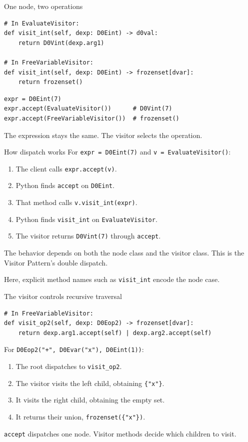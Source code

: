 \documentclass[aspectratio=169,11pt]{beamer}
\newcommand{\code}[1]{\texttt{#1}}
\begin{document}
\begin{frame}[fragile]{One node, two operations}
\begin{lstlisting}
# In EvaluateVisitor:
def visit_int(self, dexp: D0Eint) -> d0val:
    return D0Vint(dexp.arg1)

# In FreeVariableVisitor:
def visit_int(self, dexp: D0Eint) -> frozenset[dvar]:
    return frozenset()
\end{lstlisting}
\begin{lstlisting}
expr = D0Eint(7)
expr.accept(EvaluateVisitor())      # D0Vint(7)
expr.accept(FreeVariableVisitor())  # frozenset()
\end{lstlisting}
The expression stays the same. The visitor selects the operation.
\end{frame}

\begin{frame}{How dispatch works}
For \code{expr = D0Eint(7)} and \code{v = EvaluateVisitor()}:
\begin{enumerate}
\item The client calls \code{expr.accept(v)}.
\item Python finds \code{accept} on \code{D0Eint}.
\item That method calls \code{v.visit\_int(expr)}.
\item Python finds \code{visit\_int} on \code{EvaluateVisitor}.
\item The visitor returns \code{D0Vint(7)} through \code{accept}.
\end{enumerate}
\medskip
The behavior depends on both the node class and the visitor class.
This is the Visitor Pattern's \alert{double dispatch}.
\medskip

Here, explicit method names such as \code{visit\_int} encode the node case.
\end{frame}

\begin{frame}[fragile]{The visitor controls recursive traversal}
\begin{lstlisting}
# In FreeVariableVisitor:
def visit_op2(self, dexp: D0Eop2) -> frozenset[dvar]:
    return dexp.arg1.accept(self) | dexp.arg2.accept(self)
\end{lstlisting}
For \code{D0Eop2("+", D0Evar("x"), D0Eint(1))}:
\begin{enumerate}
\item The root dispatches to \code{visit\_op2}.
\item The visitor visits the left child, obtaining \code{\{"x"\}}.
\item It visits the right child, obtaining the empty set.
\item It returns their union, \code{frozenset(\{"x"\})}.
\end{enumerate}
\medskip
\code{accept} dispatches one node. Visitor methods decide which children to visit.
\end{frame}
\end{document}
